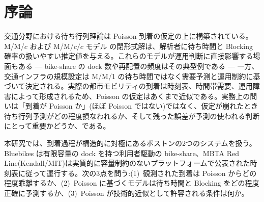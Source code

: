 
\begin{abstract}
\noindent 本研究では、ボストンの2つの都市モビリティシステムが Poisson 到着の仮定からどの程度乖離しているかを検証し、結果として待ち行列予測に生じる誤差を定量化する。Bluebikes(Kendall/MIT および MIT Vassar~St、利用者駆動・有限容量)と MBTA Red Line(Kendall/MIT、時刻表駆動)の4か月分のデータを用いて、すべてのシステムで指数分布の到着間隔を棄却した($p \approx 0$、Kolmogorov--Smirnov、Anderson--Darling、$\chi^2$ 検定)。ただし方向は正反対で、Bluebikes は過分散($\mathrm{CV} = 1.75$--$1.90$、最良適合は Weibull)、MBTA は過小分散($\mathrm{CV} = 0.63$--$0.71$、最良適合は log-normal)を示す。解析的 Poisson 待ち行列モデルは Bluebikes の待ち時間を約1桁、Kendall/MIT における Erlang~B Blocking 確率を55倍、それぞれ過小評価する一方、MBTA の待ち時間は 5--12$\times$ 過大評価する。最良適合の Weibull/log-normal IAT は $W_q$ を秒単位で再現するが、$55\times$ の Blocking ギャップのうち約 1/7 しか埋めることができない。すなわち marginal な IAT 分布は待ち時間には十分だが Blocking には不十分であり、残差は $\lambda(t)$ および/または $\mu(t)$ の非定常性と整合する — これは定常的な到着過程の修正だけでは扱えない。
\end{abstract}

\section{序論}\label{sec:intro}

交通分野における待ち行列理論は Poisson 到着の仮定の上に構築されている。M/M/$c$ および M/M/$c/c$ モデル \cite{kleinrock1975,erlang1917} の閉形式解は、解析者に待ち時間と Blocking 確率の扱いやすい推定値を与える。これらのモデルが運用判断に直接影響する場面もある — bike-share の dock 数や再配置の頻度はその典型例である — 一方、交通インフラの規模設定は M/M/1 の待ち時間ではなく需要予測と運用制約に基づいて決定される。実際の都市モビリティの到着は時刻表、時間帯需要、運用障害によって形成されるため、Poisson の仮定はあくまで近似である。実務上の問いは「到着が Poisson か」(ほぼ Poisson ではない)ではなく、仮定が崩れたとき待ち行列予測がどの程度損なわれるか、そして残った誤差が予測の使われる判断にとって重要かどうか、である。

本研究では、到着過程が構造的に対極にあるボストンの2つのシステムを扱う。Bluebikes は有限容量の dock を持つ利用者駆動の bike-share、MBTA Red Line(Kendall/MIT)は実質的に容量制約のないプラットフォームで公表された時刻表に従って運行する。次の3点を問う:(1)~観測された到着は Poisson からどの程度乖離するか、(2)~Poisson に基づくモデルは待ち時間と Blocking をどの程度正確に予測するか、(3)~Poisson が技術的近似として許容される条件は何か。

